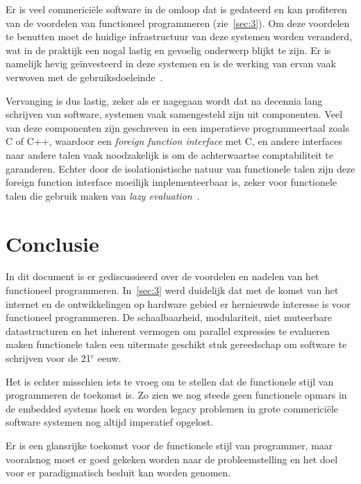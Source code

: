 \documentclass[twoside,twocolumn]{article}
\begin{document}
Er is veel commerici\"ele software in de omloop dat is gedateerd en kan
profiteren van de voordelen van functioneel programmeren (zie~\cref{sec:3}).
Om deze voordelen te benutten moet de huidige infrastructuur van deze systemen
worden veranderd, wat in de praktijk een nogal lastig en gevoelig onderwerp
blijkt te zijn. Er is namelijk hevig ge\"investeerd in deze systemen  en is de
werking van ervan vaak verwoven met de gebruiksdoeleinde~\cite{src18,src25}.

Vervanging is dus lastig, zeker als er nagegaan wordt dat na decennia lang
schrijven van software, systemen vaak samengesteld zijn uit componenten. Veel
van deze componenten zijn geschreven in een imperatieve programmeertaal zoals C
of C++, waardoor een \textit{foreign function interface} met C, en andere
interfaces naar andere talen vaak noodzakelijk is om de achterwaartse
comptabiliteit te garanderen\cite{src19}. Echter door de isolationistische
natuur van functionele talen zijn deze foreign function interface moeilijk
implementeerbaar is, zeker voor functionele talen die gebruik maken van
\textit{lazy evaluation}~\cite[p.~149]{src26}.

\section{Conclusie}
\label{sec:5}

In dit document is er gediscussieerd over de voordelen en nadelen van het
functioneel programmeren. In~\cref{sec:3} werd duidelijk dat met de komst van
het internet en de ontwikkelingen op hardware gebied er hernieuwde interesse is
voor functioneel programmeren. De schaalbaarheid, modulariteit, niet muteerbare
datastructuren en het inherent vermogen om parallel expressies te evalueren
maken functionele talen een uitermate geschikt stuk gereedschap om software te
schrijven voor de 21$^e$ eeuw.

Het is echter misschien iets te vroeg om te stellen dat de functionele stijl
van programmeren de toekomst is. Zo zien we nog steeds geen functionele opmars
in de embedded systems hoek en worden legacy problemen in grote commerici\"ele
software systemen nog altijd imperatief opgelost.

Er is een glansrijke toekomst voor de functionele stijl van programmer, maar
vooralsnog moet er goed gekeken worden naar de probleemstelling en het doel
voor er paradigmatisch besluit kan worden genomen.

\end{document}
